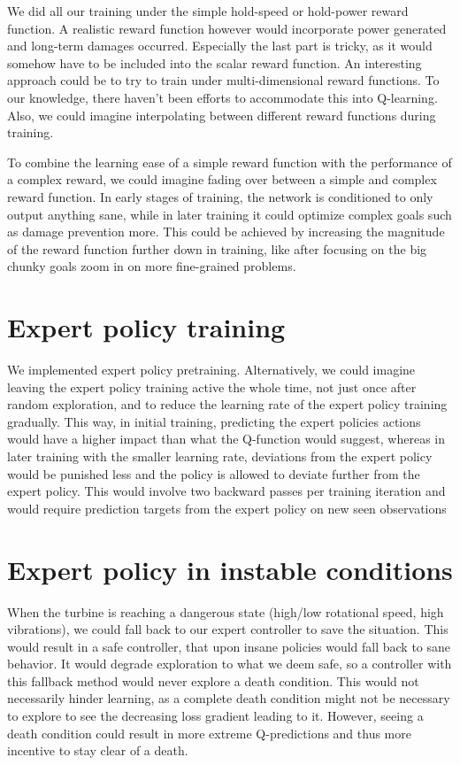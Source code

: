 \documentclass[hyperref,final,beleg]{cgvpub}
\begin{document}
We did all our training under the simple hold-speed or hold-power reward function. A realistic reward function however would incorporate power generated and long-term damages occurred. Especially the last part is tricky, as it would somehow have to be included into the scalar reward function. An interesting approach could be to try to train under multi-dimensional reward functions. To our knowledge, there haven't been efforts to accommodate this into Q-learning. Also, we could imagine interpolating between different reward functions during training.

To combine the learning ease of a simple reward function with the performance of a complex reward, we could imagine fading over between a simple and complex reward function. In early stages of training, the network is conditioned to only output anything sane, while in later training it could optimize complex goals such as damage prevention more. This could be achieved by increasing the magnitude of the reward function further down in training, like after focusing on the big chunky goals zoom in on more fine-grained problems.


\section{Expert policy training}

We implemented expert policy pretraining. Alternatively, we could imagine leaving the expert policy training active the whole time, not just once after random exploration, and to reduce the learning rate of the expert policy training gradually. This way, in initial training, predicting the expert policies actions would have a higher impact than what the Q-function would suggest, whereas in later training with the smaller learning rate, deviations from the expert policy would be punished less and the policy is allowed to deviate further from the expert policy. This would involve two backward passes per training iteration and would require prediction targets from the expert policy on new seen observations

\section{Expert policy in instable conditions}
When the turbine is reaching a dangerous state (high/low rotational speed, high vibrations), we could fall back to our expert controller to save the situation. This would result in a safe controller, that upon insane policies would fall back to sane behavior. It would degrade exploration to what we deem safe, so a controller with this fallback method would never explore a death condition. This would not necessarily hinder learning, as a complete death condition might not be necessary to explore to see the decreasing loss gradient leading to it. However, seeing a death condition could result in more extreme Q-predictions and thus more incentive to stay clear of a death.
\end{document}

